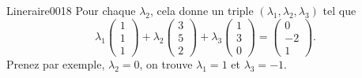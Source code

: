 \begin{corrige}{Lineraire0018}
	Pour chaque $\lambda_2$, cela donne un triple $(\lambda_1,\lambda_2,\lambda_3)$ tel que
	\begin{equation}
		\lambda_1\begin{pmatrix}
			1	\\ 
			1	\\ 
			1	
		\end{pmatrix}
		+\lambda_2\begin{pmatrix}
			3	\\ 
			5	\\ 
			2	
		\end{pmatrix}+
		\lambda_3
		\begin{pmatrix}
			1	\\ 
			3	\\ 
			0	
		\end{pmatrix}
		=
		\begin{pmatrix}
			0	\\ 
			-2	\\ 
			1	
		\end{pmatrix}.
	\end{equation}
	Prenez par exemple, $\lambda_2=0$, on trouve $\lambda_1=1$ et $\lambda_3=-1$.

\end{corrige}
